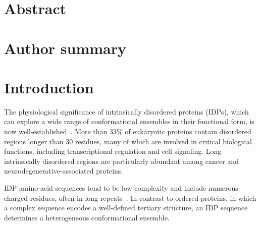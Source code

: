 \documentclass[10pt,letterpaper]{article}
\begin{document}
\section*{Abstract}


\section*{Author summary} 


\section*{Introduction}

The physiological significance of intrinsically disordered proteins (IDPs), which can explore a wide range of conformational ensembles in their functional form, is now well-established~\cite {Uversky2013a,Panchenko2015,Ward2004a,Dyson2005a}. More than 33\% of eukaryotic proteins contain disordered regions longer than 30 residues\cite{Ward2004a}, many of which are involved in critical biological functions, including transcriptional regulation and cell signaling\cite{Dunker2005}. Long intrinsically disordered regions are particularly abundant among cancer and neurodegenerative-associated proteins\cite{Habchi2014,Babu2011}.  

IDP amino-acid sequences tend to be low complexity and include numerous charged residues, often in long repeats~\cite{Uversky2013a}. In contrast to ordered proteins, in which a complex sequence encodes a well-defined tertiary structure, an IDP sequence determines a heterogeneous conformational ensemble. 
\end{document}
